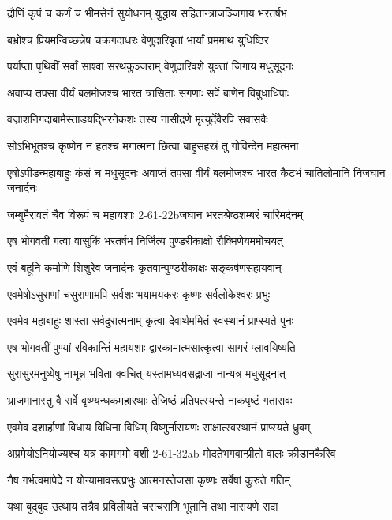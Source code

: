 \twolineshloka
{द्रौणिं कृपं च कर्णं च भीमसेनं सुयोधनम्}
{युद्धाय सहितान्त्राजञ्जिगाय भरतर्षभ}


\twolineshloka
{बभ्रोश्च प्रियमन्विच्छन्नेष चक्रगदाधरः}
{वेणुदारिवृतां भार्यां प्रममाथ युधिष्ठिर}


\twolineshloka
{पर्याप्तां पृथिवीं सर्वां साश्वां सरथकुञ्जराम्}
{वेणुदारिवशे युक्तां जिगाय मधुसूदनः}


\twolineshloka
{अवाप्य तपसा वीर्यं बलमोजश्च भारत}
{त्रासिताः सगणाः सर्वे बाणेन विबुधाधिपाः}


\twolineshloka
{वज्राशनिगदाबामैस्ताडयद्भिरनेकशः}
{तस्य नासीद्रणे मृत्युर्देवैरपि सवासवैः}


\twolineshloka
{सोऽभिभूतश्च कृष्णेन न हतश्च मगात्मना}
{छित्वा बाहुसहस्रं तु गोविन्देन महात्मना}


\threelineshloka
{एषोऽपीडन्महाबाहुः कंसं च मधुसूदनः}
{अवाप्तं तपसा वीर्यं बलमोजश्च भारत}
{कैटभं चातिलोमानि निजघान जनार्दनः}


\twolineshloka
{जम्बुमैरावतं चैव विरूपं च महायशाः}
{2-61-22bजघान भरतश्रेष्ठशम्बरं चारिमर्दनम्}


\twolineshloka
{एष भोगवतीं गत्वा वासुकिं भरतर्षभ}
{निर्जित्य पुण्डरीकाक्षो रौक्मिणेयममोचयत्}


\twolineshloka
{एवं बहूनि कर्माणि शिशुरेव जनार्दनः}
{कृतवान्पुण्डरीकाक्षः सङ्कर्षणसहायवान्}


\twolineshloka
{एवमेषोऽसुराणां चसुराणामपि सर्वशः}
{भयामयकरः कृष्णः सर्वलोकेश्वरः प्रभुः}


\twolineshloka
{एवमेव महाबाहुः शास्ता सर्वदुरात्मनाम्}
{कृत्वा देवार्थममितं स्वस्थानं प्राप्स्यते पुनः}


\twolineshloka
{एष भोगवतीं पुण्यां रविकान्तिं महायशाः}
{द्वारकामात्मसात्कृत्वा सागरं प्लावयिष्यति}


\twolineshloka
{सुरासुरमनुष्येषु नाभून्न भविता क्वचित्}
{यस्तामध्यवसद्राजा नान्यत्र मधुसूदनात्}


\twolineshloka
{भ्राजमानास्तु वै सर्वे वृष्ण्यन्धकमहारथाः}
{तेजिष्ठं प्रतिपत्स्यन्ते नाकपृष्टं गतासवः}


\twolineshloka
{एवमेव दशार्हाणां विधाय विधिना विधिम्}
{विष्णुर्नारायणः साक्षात्स्वस्थानं प्राप्स्यते ध्रुवम्}


\twolineshloka
{अप्रमेयोऽनियोज्यश्च यत्र कामगमो वशी}
{2-61-32ab मोदतेभगवान्प्रीतो वालः क्रीडानकैरिव}


\twolineshloka
{नैष गर्भत्वमापेदे न योन्यामावसत्प्रभुः}
{आत्मनस्तेजसा कृष्णः सर्वेषां कुरुते गतिम्}


\twolineshloka
{यथा बुद्बुद उत्थाय तत्रैव प्रविलीयते}
{चराचराणि भूतानि तथा नारायणे सदा}


